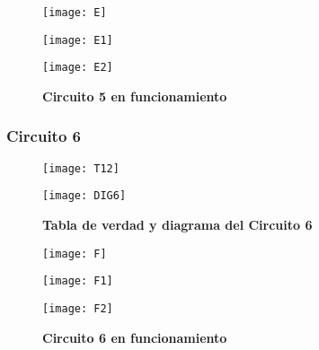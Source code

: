 \documentclass[a4paper,12pt]{article}
\begin{document}
\begin{figure}[ht!]
\centering
	\texttt{[image: E]}
\end{figure}

\begin{figure}[ht!]
\begin{multicols}{2}
	\centering

		\texttt{[image: E1]}

	\columnbreak

		\texttt{[image: E2]}

\end{multicols}
\vspace{-0.5cm}
\caption{\textbf{Circuito 5 en funcionamiento}}
\end{figure}

\newpage

\subsubsection{Circuito 6}

\begin{figure}[ht!]
\begin{multicols}{2}
	\centering

	\texttt{[image: T12]}

	\columnbreak
	
	\texttt{[image: DIG6]}
	
\end{multicols}
\vspace{-0.5cm}
\caption{\textbf{Tabla de verdad y diagrama del Circuito 6}}
\end{figure}

\begin{figure}[ht!]
\centering
	\texttt{[image: F]}
\end{figure}

\begin{figure}[ht!]
\begin{multicols}{2}
	\centering

		\texttt{[image: F1]}

	\columnbreak

		\texttt{[image: F2]}

\end{multicols}
\vspace{-0.5cm}
\caption{\textbf{Circuito 6 en funcionamiento}}
\end{figure}
\end{document}
